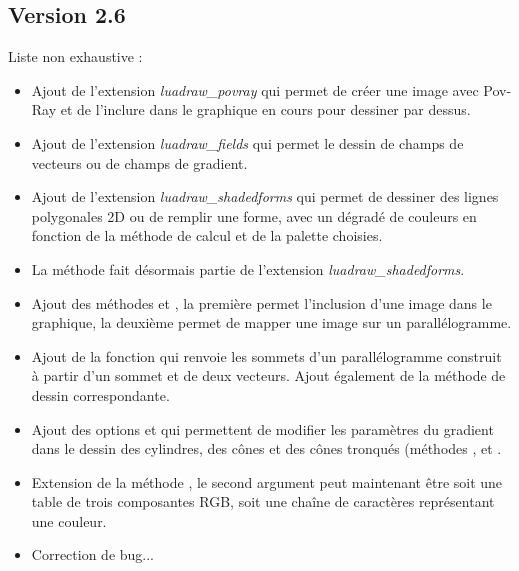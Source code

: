 \subsection{Version 2.6}
Liste non exhaustive :
\begin{itemize}
    \item Ajout de l'extension \emph{luadraw\_povray} qui permet de créer une image avec Pov-Ray et de l'inclure dans le graphique en cours pour dessiner par dessus.
    
    \item Ajout de l'extension \emph{luadraw\_fields} qui permet le dessin de champs de vecteurs ou de champs de gradient.
    \item Ajout de l'extension \emph{luadraw\_shadedforms} qui  permet de dessiner des lignes polygonales 2D ou de remplir une forme, avec un dégradé de couleurs en fonction de la méthode de calcul et de la palette choisies.
    \item La méthode  fait désormais partie de l'extension \emph{luadraw\_shadedforms}.    
    \item Ajout des méthodes  et , la première permet l'inclusion d'une image dans le graphique, la deuxième permet de mapper une image sur un parallélogramme.
    \item Ajout de la fonction  qui renvoie les sommets d'un parallélogramme construit à partir d'un sommet et de deux vecteurs. Ajout également de la méthode de dessin  correspondante.
    \item Ajout des options  et  qui permettent de modifier les paramètres du gradient dans le dessin des cylindres, des cônes et des cônes tronqués (méthodes ,  et .
    \item Extension de la méthode , le second argument peut maintenant être soit une table de trois composantes RGB, soit une chaîne de caractères représentant une couleur.
    \item Correction de bug...
\end{itemize}


